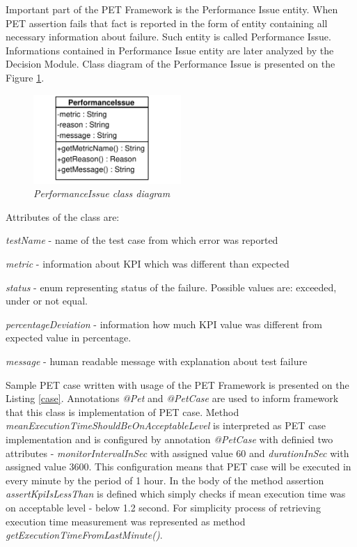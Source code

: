 \documentclass[10pt,a4paper]{article}
\let\tempone\itemize
\let\temptwo\enditemize
\renewenvironment{itemize}{\tempone\addtolength{\itemsep}{-0.4\baselineskip}}{\temptwo}
\begin{document}
Important part of the PET Framework is the Performance Issue entity. When PET assertion fails that fact is reported in the form of entity containing all necessary information about failure. Such entity is called Performance Issue. Informations contained in Performance Issue entity are later analyzed by the Decision Module. Class diagram of the Performance Issue is presented on the Figure \ref{issue}.

\begin{figure}[!htb]
\centering
\includegraphics[width=0.5\textwidth]{PerformanceIssueClassDiagram}
\caption{\textit{PerformanceIssue class diagram}} \label{issue}
\end{figure}
 
Attributes of the class are: 
\begin{itemize}
\item \textit{testName} - name of the test case from which error was reported
\item \textit{metric} - information about KPI which was different than expected
\item \textit{status} - enum representing status of the failure. Possible values are:  exceeded, under or not equal.
\item \textit{percentageDeviation} - information how much KPI value was different from expected value in percentage. 
\item \textit{message} - human readable message with explanation about test failure
\end{itemize}

Sample PET case written with usage of the PET Framework is presented on the Listing \ref{case}. Annotations \textit{@Pet} and \textit{@PetCase} are used to inform framework that this class is implementation of PET case. Method  \textit{meanExecutionTimeShouldBeOnAcceptableLevel} is interpreted as PET case implementation and is configured by annotation \textit{@PetCase} with definied two attributes - \textit{monitorIntervalInSec} with assigned value 60 and \textit{durationInSec} with assigned value 3600. This configuration means that PET case will be executed in every minute by the period of 1 hour. In the body of the method assertion \textit{assertKpiIsLessThan} is defined which simply checks if mean execution time was on acceptable level - below 1.2 second. For simplicity process of retrieving execution time measurement was represented as method  \textit{getExecutionTimeFromLastMinute()}.  
\end{document}
